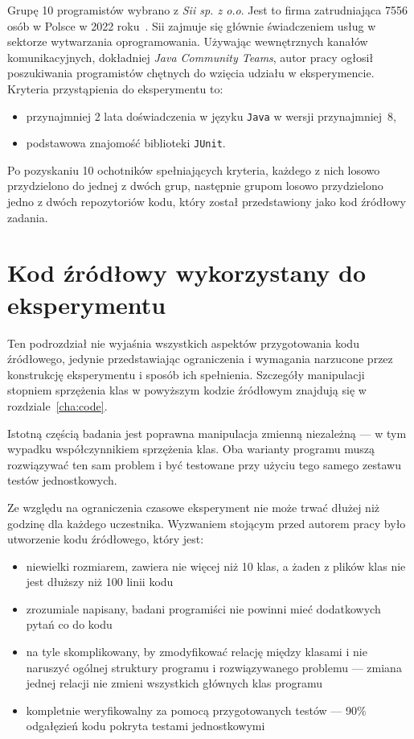 Grupę 10 programistów wybrano z \emph{Sii sp. z o.o}.
Jest to firma zatrudniająca 7556 osób w Polsce w 2022 roku~\cite{sii}.
Sii zajmuje się głównie świadczeniem usług w sektorze wytwarzania oprogramowania.
Używając wewnętrznych kanałów komunikacyjnych, dokładniej \emph{Java Community Teams}, autor pracy ogłosił poszukiwania
programistów chętnych do wzięcia udziału w eksperymencie.
Kryteria przystąpienia do eksperymentu to:

\begin{itemize}
    \item przynajmniej 2 lata doświadczenia w języku \texttt{Java} w wersji przynajmniej~8,
    \item podstawowa znajomość biblioteki \texttt{JUnit}.
\end{itemize}

Po pozyskaniu 10 ochotników spełniających kryteria, każdego z nich losowo przydzielono do jednej z dwóch grup,
następnie grupom losowo przydzielono jedno z dwóch repozytoriów kodu, który został przedstawiony jako kod źródłowy
zadania.


\section{Kod źródłowy wykorzystany do eksperymentu}

Ten podrozdział nie wyjaśnia wszystkich aspektów przygotowania kodu źródłowego, jedynie przedstawiając ograniczenia
i wymagania narzucone przez konstrukcję eksperymentu i sposób ich spełnienia.
Szczegóły manipulacji stopniem sprzężenia klas w powyższym kodzie źródłowym znajdują się w rozdziale~\ref{cha:code}.

Istotną częścią badania jest poprawna manipulacja zmienną niezależną --- w tym wypadku współczynnikiem sprzężenia klas.
Oba warianty programu muszą rozwiązywać ten sam problem i być testowane przy użyciu tego samego zestawu
testów jednostkowych.

Ze względu na ograniczenia czasowe eksperyment nie może trwać dłużej niż godzinę dla każdego uczestnika.
Wyzwaniem stojącym przed autorem pracy było utworzenie kodu źródłowego, który jest:

\begin{itemize}
    \item niewielki rozmiarem, zawiera nie więcej niż 10 klas, a żaden z plików klas nie jest dłuższy niż 100 linii kodu
    \item zrozumiale napisany, badani programiści nie powinni mieć dodatkowych pytań co do kodu
    \item na tyle skomplikowany, by zmodyfikować relację między klasami i nie naruszyć ogólnej struktury programu i
    rozwiązywanego problemu --- zmiana jednej relacji nie zmieni wszystkich głównych klas programu
    \item kompletnie weryfikowalny za pomocą przygotowanych testów --- 90\% odgałęzień kodu pokryta
    testami jednostkowymi
\end{itemize}


